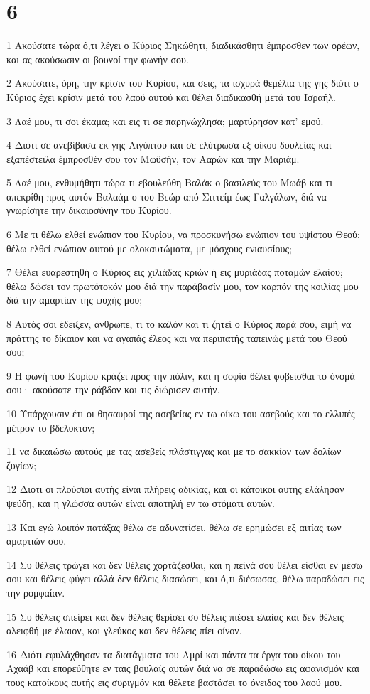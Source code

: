 \chapter{6}

\par 1 Ακούσατε τώρα ό,τι λέγει ο Κύριος Σηκώθητι, διαδικάσθητι έμπροσθεν των ορέων, και ας ακούσωσιν οι βουνοί την φωνήν σου.
\par 2 Ακούσατε, όρη, την κρίσιν του Κυρίου, και σεις, τα ισχυρά θεμέλια της γης διότι ο Κύριος έχει κρίσιν μετά του λαού αυτού και θέλει διαδικασθή μετά του Ισραήλ.
\par 3 Λαέ μου, τι σοι έκαμα; και εις τι σε παρηνώχλησα; μαρτύρησον κατ' εμού.
\par 4 Διότι σε ανεβίβασα εκ γης Αιγύπτου και σε ελύτρωσα εξ οίκου δουλείας και εξαπέστειλα έμπροσθέν σου τον Μωϋσήν, τον Ααρών και την Μαριάμ.
\par 5 Λαέ μου, ενθυμήθητι τώρα τι εβουλεύθη Βαλάκ ο βασιλεύς του Μωάβ και τι απεκρίθη προς αυτόν Βαλαάμ ο του Βεώρ από Σιττείμ έως Γαλγάλων, διά να γνωρίσητε την δικαιοσύνην του Κυρίου.
\par 6 Με τι θέλω ελθεί ενώπιον του Κυρίου, να προσκυνήσω ενώπιον του υψίστου Θεού; θέλω ελθεί ενώπιον αυτού με ολοκαυτώματα, με μόσχους ενιαυσίους;
\par 7 Θέλει ευαρεστηθή ο Κύριος εις χιλιάδας κριών ή εις μυριάδας ποταμών ελαίου; θέλω δώσει τον πρωτότοκόν μου διά την παράβασίν μου, τον καρπόν της κοιλίας μου διά την αμαρτίαν της ψυχής μου;
\par 8 Αυτός σοι έδειξεν, άνθρωπε, τι το καλόν και τι ζητεί ο Κύριος παρά σου, ειμή να πράττης το δίκαιον και να αγαπάς έλεος και να περιπατής ταπεινώς μετά του Θεού σου;
\par 9 Η φωνή του Κυρίου κράζει προς την πόλιν, και η σοφία θέλει φοβείσθαι το όνομά σου· ακούσατε την ράβδον και τις διώρισεν αυτήν.
\par 10 Υπάρχουσιν έτι οι θησαυροί της ασεβείας εν τω οίκω του ασεβούς και το ελλιπές μέτρον το βδελυκτόν;
\par 11 να δικαιώσω αυτούς με τας ασεβείς πλάστιγγας και με το σακκίον των δολίων ζυγίων;
\par 12 Διότι οι πλούσιοι αυτής είναι πλήρεις αδικίας, και οι κάτοικοι αυτής ελάλησαν ψεύδη, και η γλώσσα αυτών είναι απατηλή εν τω στόματι αυτών.
\par 13 Και εγώ λοιπόν πατάξας θέλω σε αδυνατίσει, θέλω σε ερημώσει εξ αιτίας των αμαρτιών σου.
\par 14 Συ θέλεις τρώγει και δεν θέλεις χορτάζεσθαι, και η πείνά σου θέλει είσθαι εν μέσω σου και θέλεις φύγει αλλά δεν θέλεις διασώσει, και ό,τι διέσωσας, θέλω παραδώσει εις την ρομφαίαν.
\par 15 Συ θέλεις σπείρει και δεν θέλεις θερίσει συ θέλεις πιέσει ελαίας και δεν θέλεις αλειφθή με έλαιον, και γλεύκος και δεν θέλεις πίει οίνον.
\par 16 Διότι εφυλάχθησαν τα διατάγματα του Αμρί και πάντα τα έργα του οίκου του Αχαάβ και επορεύθητε εν ταις βουλαίς αυτών διά να σε παραδώσω εις αφανισμόν και τους κατοίκους αυτής εις συριγμόν και θέλετε βαστάσει το όνειδος του λαού μου.

